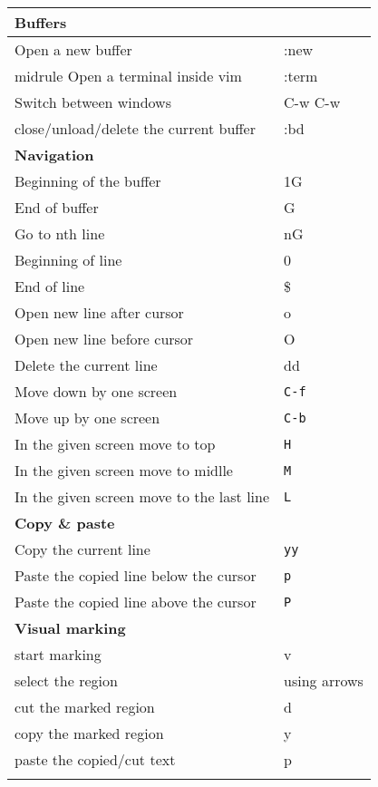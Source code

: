 \documentclass{article}
\begin{document}
\begin{longtable}{ll}
\toprule
{\bfseries Buffers} & \\ \midrule
Open a new buffer & :new \\midrule
Open a terminal inside vim & :term \\ \midrule
Switch between windows & C-w C-w \\ \midrule
close/unload/delete the current buffer & :bd \\ \midrule
{\bfseries Navigation} & \\ \midrule
Beginning of the buffer & 1G \\ \midrule
End of buffer & G \\ \midrule
Go to nth line & nG\\ \midrule
Beginning of line & 0\\ \midrule
End of line & \$\\ \midrule
Open new line after cursor & o \\ \midrule
Open new line before cursor & O \\ \midrule
Delete the current line & dd \\  \midrule
Move down by one screen & \verb!C-f!\\ \midrule
Move up by one screen & \verb!C-b!\\ \midrule
In the given screen move to top & \verb!H!\\ \midrule
In the given screen move to midlle & \verb!M!\\ \midrule
In the given screen move to the last line & \verb!L!\\ \midrule
{\bfseries Copy \& paste} & \\ \midrule
Copy the current line & \verb!yy!\\ \midrule
Paste the copied line below the cursor & \verb!p!\\ \midrule
Paste the copied line above the cursor & \verb!P!\\ \midrule
{\bfseries Visual marking} & \\ \midrule
start marking & v \\ \midrule
select the region & using arrows\\ \midrule
cut the marked region & d \\ \midrule
copy the marked region & y \\ \midrule
paste the copied/cut text & p \\ \midrule
                          & \\ \bottomrule
\end{longtable}
\end{document}
